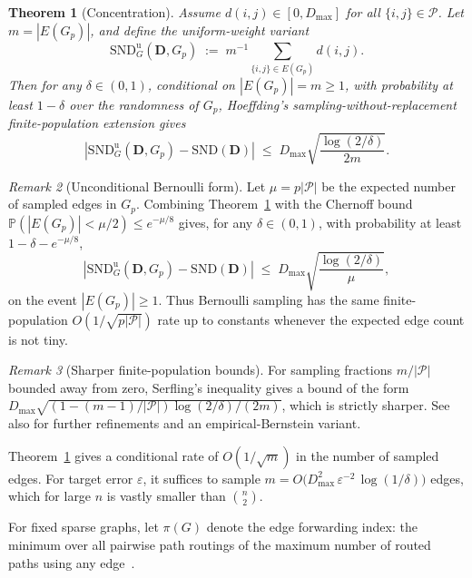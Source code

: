 \documentclass{article}
\theoremstyle{plain}
\newtheorem{theorem}{Theorem}
\theoremstyle{definition}
\theoremstyle{remark}
\newtheorem{remark}[theorem]{Remark}
\newcommand{\Prob}{\mathbb{P}}
\newcommand{\Pairs}{\mathcal{P}}         %
\newcommand{\SND}{\ensuremath{\mathrm{SND}}}
\newcommand{\SNDG}{\mathrm{SND}_{G}}
\newcommand{\abs}[1]{\left\lvert #1 \right\rvert}
\begin{document}
\begin{theorem}[Concentration]
\label{thm:concentration}
Assume $d(i,j) \in [0, D_{\max}]$ for all $\{i,j\} \in \Pairs$. Let
$m = |E(G_p)|$, and define the uniform-weight variant
\[
\SNDG^{\mathrm{u}}(\mathbf{D}, G_p) \;:=\; m^{-1}
\sum_{\{i,j\} \in E(G_p)} d(i,j).
\]
Then for any $\delta \in (0,1)$, conditional on $|E(G_p)| = m \geq 1$,
with probability at least $1 - \delta$ over the randomness of $G_p$,
Hoeffding's sampling-without-replacement finite-population extension gives
\begin{equation}
\label{eq:concentration}
\abs{\SNDG^{\mathrm{u}}(\mathbf{D}, G_p) - \SND(\mathbf{D})}
\;\leq\; D_{\max} \sqrt{\frac{\log(2/\delta)}{2m}}.
\end{equation}
\end{theorem}

\begin{remark}[Unconditional Bernoulli form]
\label{rem:chernoff-m}
Let $\mu=p|\Pairs|$ be the expected number of sampled edges in $G_p$.
Combining Theorem~\ref{thm:concentration} with the Chernoff bound
$\Prob(|E(G_p)|<\mu/2)\leq e^{-\mu/8}$ gives, for any
$\delta\in(0,1)$, with probability at least
$1-\delta-e^{-\mu/8}$,
\[
\abs{\SNDG^{\mathrm{u}}(\mathbf{D},G_p)-\SND(\mathbf{D})}
\;\leq\; D_{\max}\sqrt{\frac{\log(2/\delta)}{\mu}},
\]
on the event $|E(G_p)|\geq1$. Thus Bernoulli sampling has the same
finite-population $O(1/\sqrt{p|\Pairs|})$ rate up to constants whenever
the expected edge count is not tiny.
\end{remark}

\begin{remark}[Sharper finite-population bounds]
\label{rem:serfling}
For sampling fractions $m/|\Pairs|$ bounded away from zero, Serfling's
inequality \citep{serfling1974probability} gives a bound of the form
$D_{\max}\sqrt{(1 - (m-1)/|\Pairs|)\log(2/\delta)/(2m)}$, which is strictly
sharper. See also \citet{bardenet2015concentration} for further
refinements and an empirical-Bernstein variant.
\end{remark}

Theorem~\ref{thm:concentration} gives a conditional rate of
$O(1/\sqrt{m})$ in the number of sampled edges. For target error
$\varepsilon$, it suffices to sample
$m = O\bigl(D_{\max}^2\, \varepsilon^{-2}\, \log(1/\delta)\bigr)$ edges,
which for large $n$ is vastly smaller than $\binom{n}{2}$.

For fixed sparse graphs, let $\pi(G)$ denote the edge forwarding index:
the minimum over all pairwise path routings of the maximum number of
routed paths using any edge~\citep{chung1987forwarding,heydemann1989forwarding}.
\end{document}
